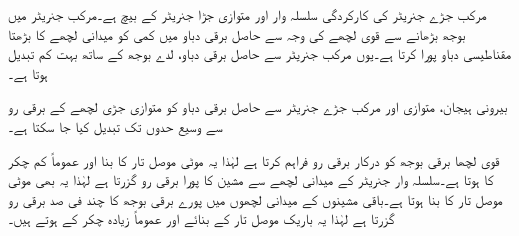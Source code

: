 مرکب جڑے جنریٹر کی کارکردگی سلسلہ وار اور متوازی جڑا جنریٹر کے بیچ ہے۔مرکب جنریٹر میں بوجھ بڑھانے سے قوی لچھے کی وجہ سے حاصل برقی دباو میں کمی کو میدانی لچھے کا بڑھتا مقناطیسی دباو پورا کرتا ہے۔یوں مرکب جنریٹر سے حاصل برقی دباو، لدے بوجھ کے ساتھ بہت کم تبدیل ہوتا ہے۔

بیرونی ہیجان، متوازی اور مرکب جڑے جنریٹر سے حاصل برقی دباو کو متوازی جڑی لچھے کے برقی رو  سے وسیع حدوں تک تبدیل کیا جا سکتا ہے۔

قوی لچھا برقی بوجھ کو درکار برقی رو فراہم کرتا ہے لہٰذا یہ موٹی موصل تار کا بنا اور عموماً کم چکر کا ہوتا ہے۔سلسلہ وار جنریٹر کے میدانی لچھے سے  مشین کا پورا برقی رو  گزرتا ہے لہٰذا یہ بھی موٹی موصل تار کا بنا ہوتا ہے۔باقی مشینوں کے میدانی لچھوں میں پورے برقی بوجھ کا چند  فی صد برقی رو گزرتا ہے لہٰذا یہ باریک موصل تار کے بنائے اور عموماً زیادہ چکر کے ہوتے ہیں۔

